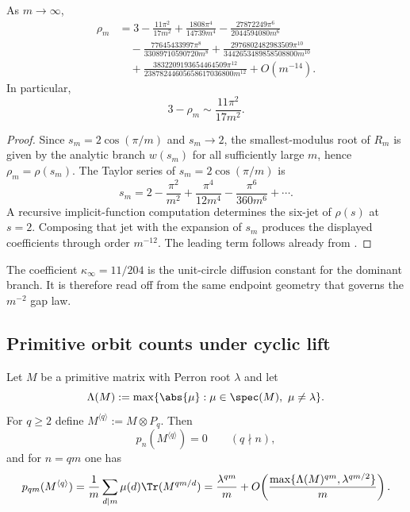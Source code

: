 \begin{theorem}
  \label{thm:rho-gap-m12}
  As $m\to\infty$,
  \begin{align*}
    \rho_m
    &=3-\frac{11\pi^2}{17m^2}
      +\frac{1808\pi^4}{14739m^4}
      -\frac{27872249\pi^6}{2044594080m^6} \\
    &\quad
      -\frac{77645433997\pi^8}{33089710590720m^8}
      +\frac{2976802482983509\pi^{10}}
             {3442653489858508800m^{10}} \\
    &\quad
      +\frac{3832209193654464509\pi^{12}}
             {23878244605658617036800m^{12}}
      +O(m^{-14}).
  \end{align*}
  In particular,
  \[
    3-\rho_m\sim \frac{11\pi^2}{17m^2}.
  \]
\end{theorem}

\begin{proof}
  Since $s_m=2\cos(\pi/m)$ and $s_m\to 2$, the smallest-modulus root of
  $R_m$ is given by the analytic branch $w(s_m)$ for all sufficiently
  large $m$, hence $\rho_m=\rho(s_m)$. The Taylor series of
  $s_m=2\cos(\pi/m)$ is
  \[
    s_m
    =2-\frac{\pi^2}{m^2}+\frac{\pi^4}{12m^4}
      -\frac{\pi^6}{360m^6}+\cdots.
  \]
  A recursive implicit-function computation determines the six-jet of
  $\rho(s)$ at $s=2$. Composing that jet with the expansion of $s_m$
  produces the displayed coefficients through order $m^{-12}$.
  The leading term follows already from .
\end{proof}

\begin{remark}
  The coefficient $\kappa_\infty=11/204$ is the unit-circle diffusion
  constant for the dominant branch. It is therefore read off from the
  same endpoint geometry that governs the $m^{-2}$ gap law.
\end{remark}

\subsection{Primitive orbit counts under cyclic lift}

\begin{proposition}
  \label{prop:cyclic-lift-primitive-asymptotics}
  Let $M$ be a primitive matrix with Perron root $\lambda$ and let
  \[
    \Lambda(M):=\max\{\abs{\mu}:\mu\in\spec(M),\ \mu\neq\lambda\}.
  \]
  For $q\ge 2$ define $M^{\langle q\rangle}:=M\otimes P_q$. Then
  \[
    p_n(M^{\langle q\rangle})=0
    \qquad (q\nmid n),
  \]
  and for $n=qm$ one has
  \[
    p_{qm}(M^{\langle q\rangle})
    =\frac{1}{m}\sum_{d\mid m}\mu(d)\Tr(M^{qm/d})
    =\frac{\lambda^{qm}}{m}
      +O\!\left(
        \frac{\max\{\Lambda(M)^{qm},\lambda^{qm/2}\}}{m}
      \right).
  \]
\end{proposition}

